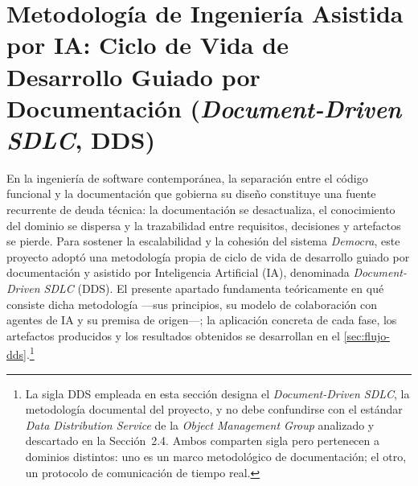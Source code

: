 %
\section{Metodología de Ingeniería Asistida por IA: Ciclo de Vida de Desarrollo Guiado por Documentación (\textit{Document-Driven SDLC}, DDS)}
\label{sec:flujo_dds_ia}

En la ingeniería de software contemporánea, la separación entre el código
funcional y la documentación que gobierna su diseño constituye una fuente
recurrente de deuda técnica: la documentación se desactualiza, el conocimiento
del dominio se dispersa y la trazabilidad entre requisitos, decisiones y
artefactos se pierde. Para sostener la escalabilidad y la cohesión del sistema
\textit{Democra}, este proyecto adoptó una metodología propia de ciclo de vida
de desarrollo guiado por documentación y asistido por Inteligencia Artificial (IA), denominada
\textit{Document-Driven SDLC} (DDS). El presente apartado fundamenta
teóricamente en qué consiste dicha metodología ---sus principios, su modelo de
colaboración con agentes de IA y su premisa de origen---; la aplicación concreta de
cada fase, los artefactos producidos y los resultados obtenidos se desarrollan en
el \autoref{sec:flujo-dds}.\footnote{La sigla DDS empleada en esta sección designa
el \textit{Document-Driven SDLC}, la metodología documental del proyecto, y
no debe confundirse con el estándar \textit{Data Distribution Service} de la
\textit{Object Management Group} analizado y descartado en la Sección~2.4. Ambos
comparten sigla pero pertenecen a dominios distintos: uno es un marco metodológico
de documentación; el otro, un protocolo de comunicación de tiempo real.}


